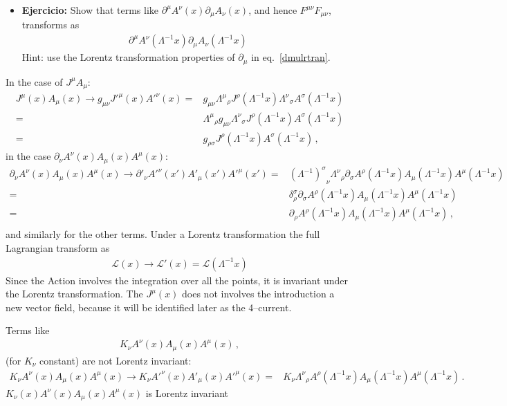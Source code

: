 \begin{subappendices}
\begin{itemize}
\item \textbf{Ejercicio:} Show that terms like $\partial^\mu A^\nu(x)\partial_\mu A_\nu(x)$, and hence $F^{\mu\nu}F_{\mu\nu}$, transforms as
  \begin{align}
    \partial^\mu A^\nu\left(\Lambda^{-1}x\right)\partial_\mu A_\nu\left(\Lambda^{-1}x\right)
  \end{align}
Hint: use the Lorentz transformation properties of $\partial_\mu$ in eq.~\eqref{dmulrtran}.
\end{itemize}
In the case of $J^\mu A_\mu$:
\begin{align}
  J^\mu(x)A_\mu(x)\to g_{\mu\nu}{J'}^\mu(x){A'}^\nu(x)=& g_{\mu\nu}{\Lambda^\mu}_\rho J^\rho\left(\Lambda^{-1}x\right){\Lambda^\nu}_\sigma A^\sigma\left(\Lambda^{-1}x\right)\nonumber\\
=& {\Lambda^\mu}_\rho g_{\mu\nu}{\Lambda^\nu}_\sigma J^\rho\left(\Lambda^{-1}x\right)A^\sigma\left(\Lambda^{-1}x\right)\nonumber\\
=& g_{\rho\sigma}J^\rho\left(\Lambda^{-1}x\right)A^\sigma\left(\Lambda^{-1}x\right)\,,
\end{align}
in the case $\partial_\nu A^\nu(x) A_\mu(x) A^\mu(x)$:
\begin{align}
   \partial_\nu A^\nu(x) A_\mu(x) A^\mu(x)\to {\partial'}_\nu{A'}^\nu(x') {A'}_\mu(x') {A'}^\mu(x')=& {\left(\Lambda^{-1}\right)^\sigma}_\nu{\Lambda^\nu}_\rho\partial_\sigma A^\rho\left(\Lambda^{-1}x\right) A_\mu\left(\Lambda^{-1}x\right) A^\mu\left(\Lambda^{-1}x\right)\nonumber\\
=& \delta^\sigma_\rho\partial_\sigma A^\rho\left(\Lambda^{-1}x\right) A_\mu\left(\Lambda^{-1}x\right) A^\mu\left(\Lambda^{-1}x\right)\nonumber\\
=& \partial_\rho A^\rho\left(\Lambda^{-1}x\right) A_\mu\left(\Lambda^{-1}x\right) A^\mu\left(\Lambda^{-1}x\right)\,,\nonumber\\
\end{align}
and similarly for the other terms. Under a Lorentz transformation the full Lagrangian transform as
\begin{align}
  \mathcal{L}(x)\to\mathcal{L}'(x)=\mathcal{L}(\Lambda^{-1}x) 
\end{align}
Since the Action involves the integration over all the points, it is invariant under the Lorentz transformation. The $J^\mu(x)$ does not involves the introduction a new vector field, because it will be identified later as the 4--current.


Terms like
\begin{align}
  K_\nu A^\nu(x) A_\mu(x) A^\mu(x)\,,
\end{align}
(for $K_\nu$ constant) are not Lorentz invariant:
\begin{align}
  K_\nu A^\nu(x) A_\mu(x) A^\mu(x)\to K_\nu{A'}^\nu(x) {A'}_\mu(x) {A'}^\mu(x)=& K_\nu{\Lambda^\nu}_\rho A^\rho\left(\Lambda^{-1}x\right) A_\mu\left(\Lambda^{-1}x\right) A^\mu\left(\Lambda^{-1}x\right)\,.
\end{align}
$K_\nu(x)A^\nu(x)A_\mu(x)A^\mu(x)$ is Lorentz invariant %





\end{subappendices}
